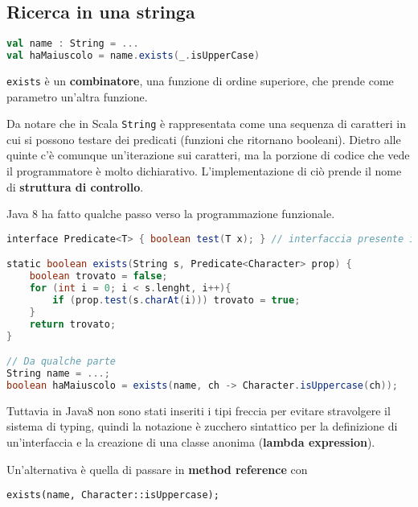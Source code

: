 


\subsection{Ricerca in una stringa}

\begin{lstlisting}[language=Scala]
val name : String = ...
val haMaiuscolo = name.exists(_.isUpperCase)
\end{lstlisting}

\noindent \texttt{exists} è un \textbf{combinatore}, una funzione di ordine superiore, che prende come parametro un'altra funzione.

Da notare che in Scala \texttt{String} è rappresentata come una sequenza di caratteri in cui si possono testare dei predicati (funzioni che ritornano booleani). Dietro alle quinte c'è comunque un'iterazione sui caratteri, ma la porzione di codice che vede il programmatore è molto dichiarativo.
L'implementazione di ciò prende il nome di \textbf{struttura di controllo}.

Java 8 ha fatto qualche passo verso la programmazione funzionale.

\begin{lstlisting}[language=Scala]
interface Predicate<T> { boolean test(T x); } // interfaccia presente in Java8

static boolean exists(String s, Predicate<Character> prop) {
	boolean trovato = false;
	for (int i = 0; i < s.lenght, i++){
		if (prop.test(s.charAt(i))) trovato = true;
	}
	return trovato;
}

// Da qualche parte
String name = ...;
boolean haMaiuscolo = exists(name, ch -> Character.isUppercase(ch));
\end{lstlisting}

Tuttavia in Java8 non sono stati inseriti i tipi freccia per evitare stravolgere il sistema di typing, quindi la notazione è zucchero sintattico per la definizione di un'interfaccia e la creazione di una classe anonima (\textbf{lambda expression}).

Un'alternativa è quella di passare in \textbf{method reference} con

\begin{center}
	\texttt{exists(name, Character::isUppercase);}
\end{center}


